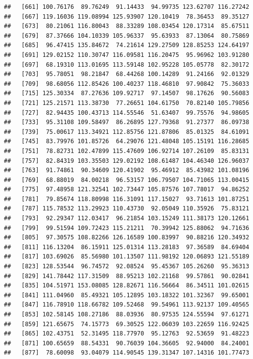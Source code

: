 \documentclass[
]{article}
\begin{document}
\begin{verbatim}
##   [661] 100.76176  89.76249  91.14433  94.99735 123.62707 116.27242
##   [667] 119.16036 119.08994 125.93907 120.10419  78.36453  89.35127
##   [673]  80.21061 116.80043  88.33289 108.03454 120.17314  85.67511
##   [679]  87.37666 104.10339 105.96337  95.63933  87.13064  80.75869
##   [685]  96.47415 135.84672  74.21614 129.27509 128.85253 124.64197
##   [691] 129.02152 110.30747 116.09581 116.20475  95.96962 103.91280
##   [697]  68.19310 113.01695 113.59148 102.95228 105.05778  82.30172
##   [703]  95.78051  98.21847  68.44268 100.14289  91.24166  92.01329
##   [709]  98.68056 112.85426 100.40237 118.46810  97.90842  75.36033
##   [715] 125.30334  87.27636 109.92717  97.14507  98.17626  90.56083
##   [721] 125.21571 113.38730  77.26651 104.61750  70.82140 105.79856
##   [727]  82.94435 100.43713 114.55546  51.63407  99.75576  94.98605
##   [733]  95.31108 109.58497  86.26895 127.79368  91.27377  86.09738
##   [739]  75.00617 113.34921 112.85756 121.87806  85.01325  84.61091
##   [745]  83.79976 101.85726  64.29076 121.48048 105.15191 116.28685
##   [751]  78.82731 102.47899 115.47609 106.92714 107.26109  85.83131
##   [757]  82.84319 103.35503 129.02192 108.61487 104.46340 126.96037
##   [763]  91.74861  90.34609 120.41902  95.46912  85.43982 101.08196
##   [769]  68.88019  84.00218  96.53157 106.79507 104.71065 113.00415
##   [775]  97.48958 121.32541 102.73447 105.87576 107.78017  94.86252
##   [781]  79.85674 118.80998 116.31091 117.15027  93.71613 101.87251
##   [787] 115.78532 113.29923 110.43730  92.05049 110.35926  75.83121
##   [793]  92.29347 112.03417  96.21854 103.15249 111.38173 120.12661
##   [799]  99.51594 109.72423 115.21211  70.39942 125.88062  94.71636
##   [805]  97.30575 108.82266 126.16589 100.83997  90.88216 120.34932
##   [811] 116.13204  86.15911 125.01314 113.28183  97.36589  84.69404
##   [817] 103.69026  85.56980 101.13507 111.98192 120.06893 121.55189
##   [823] 128.53544  96.74572  92.08524  95.45367 105.26260  95.36313
##   [829] 141.78442 117.31509  88.95213 102.21168  99.57861  90.02841
##   [835] 104.51971 153.08085 128.82671 116.56664  86.34511 101.02615
##   [841] 111.04960  85.49321 105.12895 103.18322 101.32367  99.65001
##   [847] 116.78910 118.66782 109.52468  99.54961 113.92137 109.40565
##   [853] 102.58145 108.27186  88.03936  80.97535 124.55594  97.61271
##   [859] 121.65675  74.15773  69.30525 122.06039 103.22659 116.92425
##   [865] 102.43751  52.31495 118.77970  95.12763  92.53659  91.48223
##   [871] 100.65659  88.54331  90.76039 104.36605  92.94000  84.24001
##   [877]  78.60098  93.04079 114.90545 139.31347 107.14316 101.77473

\end{verbatim}
\end{document}
